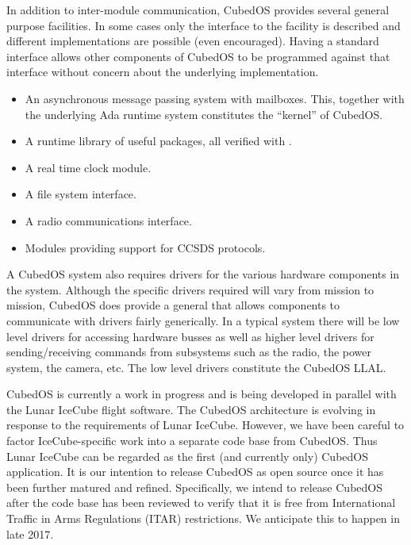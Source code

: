 In addition to inter-module communication, CubedOS provides several general purpose facilities.
In some cases only the interface to the facility is described and different implementations are
possible (even encouraged). Having a standard interface allows other components of CubedOS to be
programmed against that interface without concern about the underlying implementation.

\begin{itemize}
\item An asynchronous message passing system with mailboxes. This, together with the underlying
  Ada runtime system constitutes the ``kernel'' of CubedOS.
\item A runtime library of useful packages, all verified with \SPARK.
\item A real time clock module.
\item A file system interface.
\item A radio communications interface.
\item Modules providing support for CCSDS protocols.
\end{itemize}

A CubedOS system also requires drivers for the various hardware components in the system.
Although the specific drivers required will vary from mission to mission, CubedOS does provide a
general  that allows components to communicate with drivers fairly
generically. In a typical system there will be low level drivers for accessing hardware busses
as well as higher level drivers for sending/receiving commands from subsystems such as the
radio, the power system, the camera, etc. The low level drivers constitute the CubedOS LLAL.

CubedOS is currently a work in progress and is being developed in parallel with the Lunar
IceCube flight software. The CubedOS architecture is evolving in response to the requirements of
Lunar IceCube. However, we have been careful to factor IceCube-specific work into a separate
code base from CubedOS. Thus Lunar IceCube can be regarded as the first (and currently only)
CubedOS application. It is our intention to release CubedOS as open source once it has been
further matured and refined. Specifically, we intend to release CubedOS after the code base has
been reviewed to verify that it is free from International Traffic in Arms Regulations (ITAR)
restrictions. We anticipate this to happen in late 2017.
